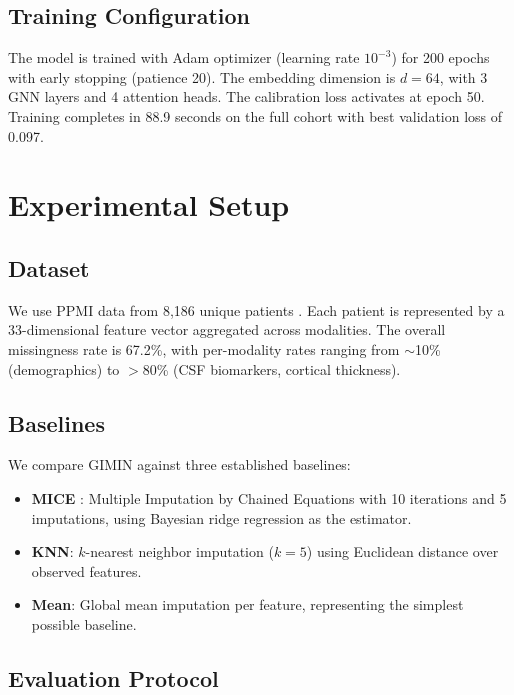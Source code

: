 \documentclass[journal,twoside,web]{ieeecolor}
\begin{document}
\subsection{Training Configuration}

The model is trained with Adam optimizer (learning rate $10^{-3}$) for 200 epochs with early stopping (patience 20). The embedding dimension is $d = 64$, with 3 GNN layers and 4 attention heads. The calibration loss activates at epoch 50. Training completes in 88.9 seconds on the full cohort with best validation loss of 0.097.

\section{Experimental Setup}
\label{sec:experiments}

\subsection{Dataset}

We use PPMI data from 8{,}186 unique patients \cite{marek2011ppmi, marek2018ppmi_cohort}. Each patient is represented by a 33-dimensional feature vector aggregated across modalities. The overall missingness rate is 67.2\%, with per-modality rates ranging from $\sim$10\% (demographics) to $>$80\% (CSF biomarkers, cortical thickness).

\subsection{Baselines}

We compare GIMIN against three established baselines:
\begin{itemize}
    \item \textbf{MICE} \cite{vanbuuren2011mice}: Multiple Imputation by Chained Equations with 10 iterations and 5 imputations, using Bayesian ridge regression as the estimator.
    \item \textbf{KNN}: $k$-nearest neighbor imputation ($k = 5$) using Euclidean distance over observed features.
    \item \textbf{Mean}: Global mean imputation per feature, representing the simplest possible baseline.
\end{itemize}

\subsection{Evaluation Protocol}
\end{document}
